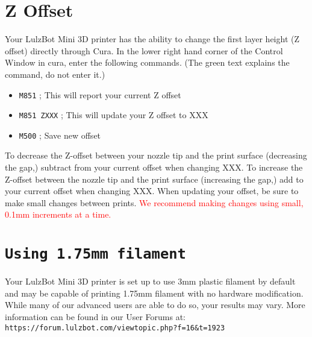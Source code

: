 
\section{Z Offset}
\label{sssec:Z Offset}
Your LulzBot Mini 3D printer has the ability to change the first layer height (Z offset) directly through Cura. In the lower right hand corner of the Control Window in cura, enter the following commands. (The green text explains the command, do not enter it.)
\begin{itemize}
\item \texttt{M851}                    \textcolor{green2}{; This will report your current Z offset}
\item \texttt{M851 ZXXX}                    \textcolor{green2}{; This will update your Z offset to XXX}
\item \texttt{M500}                    \textcolor{green2}{; Save new offset}
\end{itemize}

To decrease the Z-offset between your nozzle tip and the print surface (decreasing the gap,) subtract from your current offset when changing XXX. To increase the Z-offset between the nozzle tip and the print surface (increasing the gap,) add to your current offset when changing XXX. When updating your offset, be sure to make small changes between prints. \textcolor{red}{We recommend making changes using small, 0.1mm increments at a time.} 

\section{\texttt{Using 1.75mm filament}}

Your LulzBot Mini 3D printer is set up to use 3mm plastic filament by default and may be capable of printing 1.75mm filament with no hardware modification. While many of our advanced users are able to do so, your results may vary.  More information can be found in our User Forums at: \texttt{https://forum.lulzbot.com/viewtopic.php?f=16\&t=1923} 
